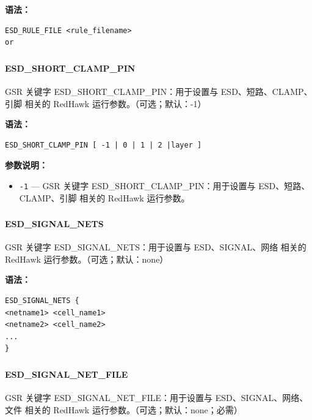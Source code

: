 \textbf{语法：}
\begin{lstlisting}
ESD_RULE_FILE <rule_filename>
or
\end{lstlisting}

\subsubsection{}
\paragraph*{ESD_SHORT_CLAMP_PIN}

GSR 关键字 ESD_SHORT_CLAMP_PIN：用于设置与 ESD、短路、CLAMP、引脚 相关的 RedHawk 运行参数。（可选；默认：-1）

\textbf{语法：}
\begin{lstlisting}
ESD_SHORT_CLAMP_PIN [ -1 | 0 | 1 | 2 |layer ]
\end{lstlisting}

\textbf{参数说明：}
\begin{itemize}
\item \texttt{-1} — GSR 关键字 ESD\_SHORT\_CLAMP\_PIN：用于设置与 ESD、短路、CLAMP、引脚 相关的 RedHawk 运行参数。
\end{itemize}

\subsubsection{}
\paragraph*{ESD_SIGNAL_NETS}

GSR 关键字 ESD_SIGNAL_NETS：用于设置与 ESD、SIGNAL、网络 相关的 RedHawk 运行参数。（可选；默认：none）

\textbf{语法：}
\begin{lstlisting}
ESD_SIGNAL_NETS {
<netname1> <cell_name1>
<netname2> <cell_name2>
...
}
\end{lstlisting}

\subsubsection{}
\paragraph*{ESD_SIGNAL_NET_FILE}

GSR 关键字 ESD_SIGNAL_NET_FILE：用于设置与 ESD、SIGNAL、网络、文件 相关的 RedHawk 运行参数。（可选；默认：none；必需）

